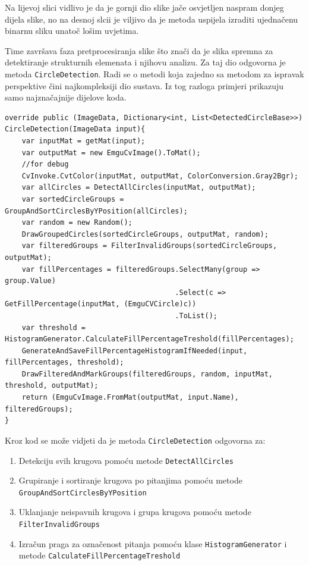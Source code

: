 \documentclass{foi}
\begin{document}
\pagebreak
Na lijevoj slici vidlivo je da je gornji dio slike jače osvjetljen naspram donjeg dijela slike, no na desnoj slcii je viljivo da je metoda uspijela izraditi ujednačenu binarnu sliku unatoč lošim uvjetima.

Time završava faza pretprocesiranja slike što znači da je slika spremna za detektiranje strukturnih elemenata i njihovu analizu.
Za taj dio odgovorna je metoda \texttt{CircleDetection}. Radi se o metodi koja zajedno sa metodom za ispravak perspektive čini najkompleksiji dio sustava. Iz tog razloga primjeri prikazuju samo najznačajnije dijelove koda.

\begin{lstlisting}[caption={Metoda za detektiranje odgovora na slici}]
override public (ImageData, Dictionary<int, List<DetectedCircleBase>>) CircleDetection(ImageData input){
    var inputMat = getMat(input);
    var outputMat = new EmguCvImage().ToMat();
    //for debug
    CvInvoke.CvtColor(inputMat, outputMat, ColorConversion.Gray2Bgr);
    var allCircles = DetectAllCircles(inputMat, outputMat);
    var sortedCircleGroups = GroupAndSortCirclesByYPosition(allCircles);
    var random = new Random();
    DrawGroupedCircles(sortedCircleGroups, outputMat, random);
    var filteredGroups = FilterInvalidGroups(sortedCircleGroups, outputMat);
    var fillPercentages = filteredGroups.SelectMany(group => group.Value)
                                        .Select(c => GetFillPercentage(inputMat, (EmguCVCircle)c))
                                        .ToList();
    var threshold = HistogramGenerator.CalculateFillPercentageTreshold(fillPercentages);
    GenerateAndSaveFillPercentageHistogramIfNeeded(input, fillPercentages, threshold);
    DrawFilteredAndMarkGroups(filteredGroups, random, inputMat, threshold, outputMat);
    return (EmguCvImage.FromMat(outputMat, input.Name), filteredGroups);
}
\end{lstlisting}

Kroz kod se može vidjeti da je metoda \texttt{CircleDetection} odgovorna za:
\begin{enumerate}
    \item Detekciju svih krugova pomoću metode \texttt{DetectAllCircles}
    \item Grupiranje i sortiranje krugova po pitanjima pomoću metode \texttt{GroupAndSortCirclesByYPosition}
    \item Uklanjanje neispavnih krugova i grupa krugova pomoću metode \texttt{FilterInvalidGroups}
    \item Izračun praga za označenost pitanja pomoću klase \texttt{HistogramGenerator} i metode \texttt{CalculateFillPercentageTreshold}   
\end{enumerate}
\end{document}
